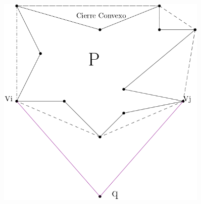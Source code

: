 \documentclass[aspectratio=169,xcolor=dvipsnames, t]{beamer}
\begin{document}
\begin{frame}{}
\begin{columns}
\begin{column}{0.45\textwidth}
\begin{figure}
        \includegraphics[width=0.9\textwidth]{imagenes/Caso01.png}
      \end{figure}
    \end{column}
  \end{columns}
\end{frame}
\end{document}
